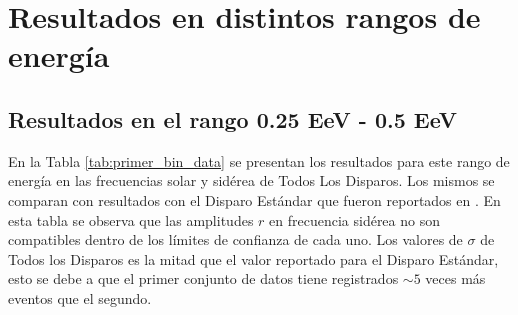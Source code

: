 \section{Resultados en distintos rangos de energía}
\subsection{Resultados en el rango 0.25 EeV - 0.5 EeV}

En la Tabla \ref{tab:primer_bin_data} se presentan los resultados para este rango de energía en las frecuencias solar y sidérea de Todos Los Disparos. Los mismos  se comparan con resultados con el Disparo Estándar que fueron reportados en \cite{Aab_2020}. En esta tabla se observa que las amplitudes $r$ en frecuencia sidérea no son compatibles dentro de los límites de confianza de cada uno. Los valores de $\sigma$ de Todos los Disparos es la mitad que el valor reportado para el Disparo Estándar,  esto se debe a que el primer conjunto de datos tiene registrados $\sim 5$  veces más eventos que el segundo.

